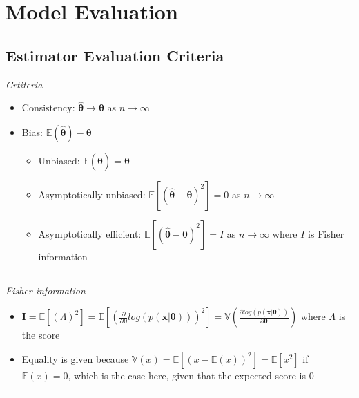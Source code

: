 \section{Model Evaluation}
\subsection*{Estimator Evaluation Criteria}
\emph{Crtiteria} --- 
\begin{itemize}
    \item Consistency: $\hat{\boldsymbol{\theta}} \rightarrow \boldsymbol{\theta}$ as $n \rightarrow \infty$
    \item Bias: $\mathbb{E}(\hat{\boldsymbol{\theta}}) - \boldsymbol{\theta}$
    \begin{itemize}
        \item Unbiased: $\mathbb{E}(\hat{\boldsymbol{\theta}}) = \boldsymbol{\theta}$
        \item Asymptotically unbiased: $\mathbb{E} [ ( \hat{\boldsymbol{\theta}} - \boldsymbol{\theta} )^2 ] = 0$ as $n \rightarrow \infty$ 
        \item Asymptotically efficient: $\mathbb{E} [ ( \hat{\boldsymbol{\theta}} - \boldsymbol{\theta} )^2 ] = I$ as $n \rightarrow \infty$  where $I$ is Fisher information 
    \end{itemize}
\end{itemize}

{\color{lightgray}\hrule height 0.001mm}

\emph{Fisher information} --- 
\begin{itemize}
    \item $\boldsymbol{I} = \mathbb{E} [(\Lambda)^2] = \mathbb{E} [ ( \frac{\partial}{ \partial \boldsymbol{\theta} } log( p ( \boldsymbol{x} | \boldsymbol{\theta} ) ) )^2 ] = \mathbb{V} ( \frac{ \partial log( p(\boldsymbol{x} | \boldsymbol{\theta}) ) }{ \partial \boldsymbol{\theta}} )$ where $\Lambda$ is the score
    \item Equality is given because $\mathbb{V}(x) = \mathbb{E}[(x-\mathbb{E}(x))^2] = \mathbb{E}[x^2]$ if $\mathbb{E}(x) = 0$, which is the case here, given that the expected score is $0$
\end{itemize}

{\color{lightgray}\hrule height 0.001mm}

